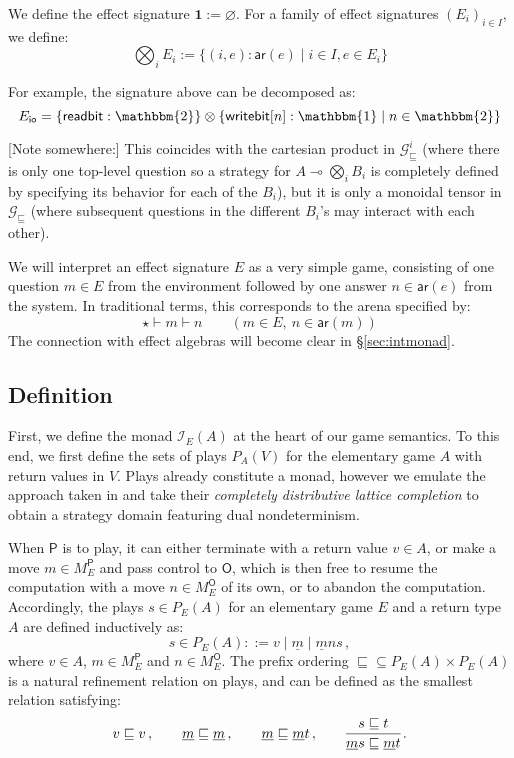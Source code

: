 \documentclass[format=sigplan,authordraft]{acmart}
\newcommand{\gcat}{\mathcal{G}_{\sqsubseteq}}
\newcommand{\kw}[1]{\ensuremath{ \mathsf{#1} }}
\begin{document}
\begin{definition}
We define the effect signature
$\mathbf{1} := \varnothing$.
For a family of effect signatures $(E_i)_{i \in I}$,
we define:
\[
  \bigotimes_i E_i := \{ (i, e) : \kw{ar}(e) \mid i \in I, e \in E_i \}
\]
\end{definition}

For example,
the signature above can be decomposed as:
\[
    E_\kw{io} = \{ \kw{readbit} : \mathbbm{2} \} \otimes
      \{ \kw{writebit}[n] : \mathbbm{1} \mid n \in \mathbbm{2} \}
\]

[Note somewhere:]
This coincides with the cartesian product in $\gcat^i$
(where there is only one top-level question
so a strategy for $A \multimap \bigotimes_i B_i$
is completely defined
by specifying its behavior for each of the $B_i$),
but it is only a monoidal tensor in $\gcat$
(where subsequent questions in the different $B_i$'s
may interact with each other).

We will interpret an effect signature $E$
as a very simple game,
consisting of
one question $m \in E$ from the environment followed by
one answer $n \in \kw{ar}(e)$ from the system.
In traditional terms,
this corresponds to the arena specified by:
\[
    \star \vdash m \vdash n \qquad
      (m \in E, \: n \in \kw{ar}(m))
\]
The connection with
effect algebras will become clear in \S\ref{sec:intmonad}.


\subsection{Definition} \label{sec:monad:def} %

First,
we define the monad $\mathcal{I}_E(A)$
at the heart of our game semantics.
To this end,
we first define the sets of plays $P_A(V)$
for the elementary game $A$ with return values in $V$.
Plays already constitute a monad,
however we emulate the approach taken in \cite{cspdnd}
and take their \emph{completely distributive lattice completion}
to obtain a strategy domain featuring dual nondeterminism.

When $\kw{P}$ is to play,
it can either terminate with a return value $v \in A$,
or make a move $m \in M_E^\kw{P}$ and pass control to $\kw{O}$,
which is then free to resume the computation with
a move $n \in M_E^\kw{O}$ of its own,
or to abandon the computation.
Accordingly,
the plays $s \in P_E(A)$
for an elementary game $E$ and a return type $A$
are defined inductively as:
\[
  s \in P_E(A) ::= v \mid \underline{m} \mid \underline{m} ns \,,
\]
where $v \in A$, $m \in M_E^\kw{P}$ and $n \in M_E^\kw{O}$.
The prefix ordering
${\sqsubseteq} \subseteq P_E(A) \times P_E(A)$
is a natural refinement relation on plays,
and can be defined
as the smallest relation satisfying:
\[
  v \sqsubseteq v \,, \qquad
  \underline{m} \sqsubseteq \underline{m} \,, \qquad
  \underline{m} \sqsubseteq \underline{m}t \,, \qquad
  \begin{prooftree}
    \hypo{s \sqsubseteq t}
    \infer1{\underline{m}s \sqsubseteq \underline{m}t}
  \end{prooftree} \,.
\]
\end{document}
